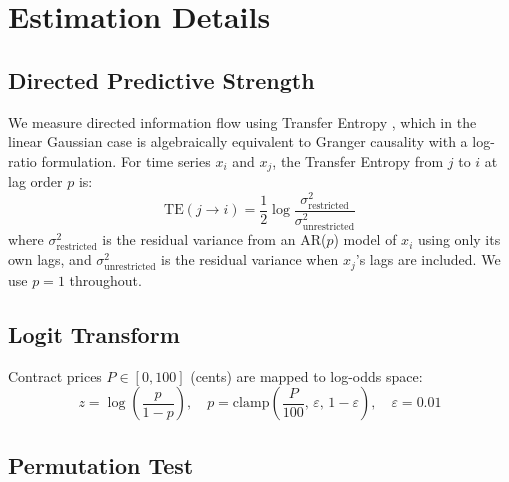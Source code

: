 \documentclass[12pt,letterpaper]{article}
\begin{document}

\newpage



\newpage
\appendix
\section{Estimation Details}\label{app:estimation}

\subsection{Directed Predictive Strength}

We measure directed information flow using Transfer Entropy \citep{schreiber2000measuring}, which in the linear Gaussian case is algebraically equivalent to Granger causality with a log-ratio formulation. For time series $x_i$ and $x_j$, the Transfer Entropy from $j$ to $i$ at lag order $p$ is:
\begin{equation}
\text{TE}(j \to i) = \frac{1}{2} \log \frac{\sigma^2_{\text{restricted}}}{\sigma^2_{\text{unrestricted}}}
\end{equation}
where $\sigma^2_{\text{restricted}}$ is the residual variance from an AR($p$) model of $x_i$ using only its own lags, and $\sigma^2_{\text{unrestricted}}$ is the residual variance when $x_j$'s lags are included. We use $p=1$ throughout.

\subsection{Logit Transform}

Contract prices $P \in [0,100]$ (cents) are mapped to log-odds space:
\begin{equation}
z = \log\!\left(\frac{p}{1-p}\right), \quad p = \text{clamp}\!\left(\frac{P}{100},\, \varepsilon,\, 1-\varepsilon\right), \quad \varepsilon = 0.01
\end{equation}

\subsection{Permutation Test}
\end{document}
